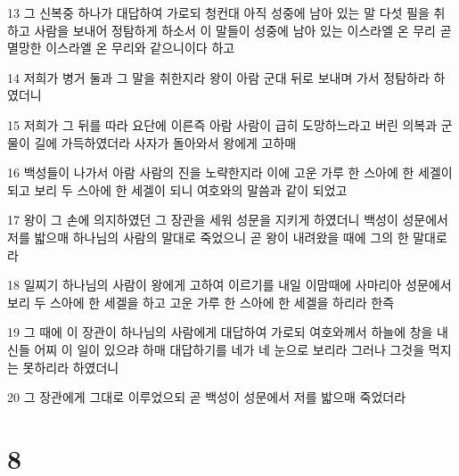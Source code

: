 \par 13 그 신복중 하나가 대답하여 가로되 청컨대 아직 성중에 남아 있는 말 다섯 필을 취하고 사람을 보내어 정탐하게 하소서 이 말들이 성중에 남아 있는 이스라엘 온 무리 곧 멸망한 이스라엘 온 무리와 같으니이다 하고
\par 14 저희가 병거 둘과 그 말을 취한지라 왕이 아람 군대 뒤로 보내며 가서 정탐하라 하였더니
\par 15 저희가 그 뒤를 따라 요단에 이른즉 아람 사람이 급히 도망하느라고 버린 의복과 군물이 길에 가득하였더라 사자가 돌아와서 왕에게 고하매
\par 16 백성들이 나가서 아람 사람의 진을 노략한지라 이에 고운 가루 한 스아에 한 세겔이 되고 보리 두 스아에 한 세겔이 되니 여호와의 말씀과 같이 되었고
\par 17 왕이 그 손에 의지하였던 그 장관을 세워 성문을 지키게 하였더니 백성이 성문에서 저를 밟으매 하나님의 사람의 말대로 죽었으니 곧 왕이 내려왔을 때에 그의 한 말대로라
\par 18 일찌기 하나님의 사람이 왕에게 고하여 이르기를 내일 이맘때에 사마리아 성문에서 보리 두 스아에 한 세겔을 하고 고운 가루 한 스아에 한 세겔을 하리라 한즉
\par 19 그 때에 이 장관이 하나님의 사람에게 대답하여 가로되 여호와께서 하늘에 창을 내신들 어찌 이 일이 있으랴 하매 대답하기를 네가 네 눈으로 보리라 그러나 그것을 먹지는 못하리라 하였더니
\par 20 그 장관에게 그대로 이루었으되 곧 백성이 성문에서 저를 밟으매 죽었더라

\chapter{8}

